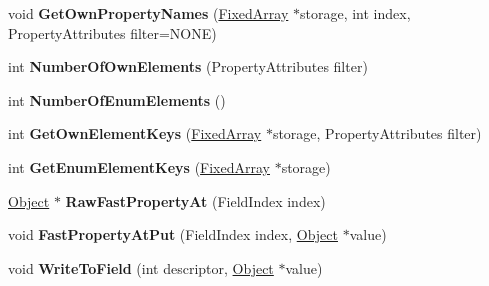 \begin{DoxyCompactItemize}
\item 
\hypertarget{classv8_1_1internal_1_1_j_s_object_a888a144b2d908ba1f4f177c31f81afc7}{}void {\bfseries Get\+Own\+Property\+Names} (\hyperlink{classv8_1_1internal_1_1_fixed_array}{Fixed\+Array} $\ast$storage, int index, Property\+Attributes filter=N\+O\+N\+E)\label{classv8_1_1internal_1_1_j_s_object_a888a144b2d908ba1f4f177c31f81afc7}

\item 
\hypertarget{classv8_1_1internal_1_1_j_s_object_a5bb553ee1a9ebe44bb00ecab1986b601}{}int {\bfseries Number\+Of\+Own\+Elements} (Property\+Attributes filter)\label{classv8_1_1internal_1_1_j_s_object_a5bb553ee1a9ebe44bb00ecab1986b601}

\item 
\hypertarget{classv8_1_1internal_1_1_j_s_object_a1cb0fec98204e495fef5e6b18fa143b6}{}int {\bfseries Number\+Of\+Enum\+Elements} ()\label{classv8_1_1internal_1_1_j_s_object_a1cb0fec98204e495fef5e6b18fa143b6}

\item 
\hypertarget{classv8_1_1internal_1_1_j_s_object_ad91b496c577b79077d9b111a87aa35b0}{}int {\bfseries Get\+Own\+Element\+Keys} (\hyperlink{classv8_1_1internal_1_1_fixed_array}{Fixed\+Array} $\ast$storage, Property\+Attributes filter)\label{classv8_1_1internal_1_1_j_s_object_ad91b496c577b79077d9b111a87aa35b0}

\item 
\hypertarget{classv8_1_1internal_1_1_j_s_object_a1c8e8f30739012933622e0817eadf006}{}int {\bfseries Get\+Enum\+Element\+Keys} (\hyperlink{classv8_1_1internal_1_1_fixed_array}{Fixed\+Array} $\ast$storage)\label{classv8_1_1internal_1_1_j_s_object_a1c8e8f30739012933622e0817eadf006}

\item 
\hypertarget{classv8_1_1internal_1_1_j_s_object_ae11828d659a1d8ce76a733b6e488a316}{}\hyperlink{classv8_1_1internal_1_1_object}{Object} $\ast$ {\bfseries Raw\+Fast\+Property\+At} (Field\+Index index)\label{classv8_1_1internal_1_1_j_s_object_ae11828d659a1d8ce76a733b6e488a316}

\item 
\hypertarget{classv8_1_1internal_1_1_j_s_object_a2a6776b07755bedb1322bb0c8623566f}{}void {\bfseries Fast\+Property\+At\+Put} (Field\+Index index, \hyperlink{classv8_1_1internal_1_1_object}{Object} $\ast$value)\label{classv8_1_1internal_1_1_j_s_object_a2a6776b07755bedb1322bb0c8623566f}

\item 
\hypertarget{classv8_1_1internal_1_1_j_s_object_ae94ac8e9385323133ebed0f8810254ea}{}void {\bfseries Write\+To\+Field} (int descriptor, \hyperlink{classv8_1_1internal_1_1_object}{Object} $\ast$value)\label{classv8_1_1internal_1_1_j_s_object_ae94ac8e9385323133ebed0f8810254ea}


\end{DoxyCompactItemize}
